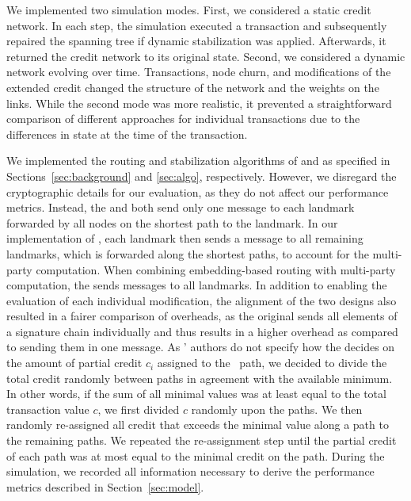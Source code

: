 We implemented two simulation modes. First, we considered a static credit network. In each step, the simulation executed a transaction and subsequently repaired the spanning tree if dynamic stabilization was applied. Afterwards, it returned the credit network to its original state. 
Second, we considered a dynamic network evolving over time. Transactions, node churn, and modifications of the extended credit changed
the structure of the network and the weights on the links. 
While the second mode was more realistic, it prevented a straightforward comparison of different approaches for individual transactions due to the differences in state at the time of the transaction.

We implemented the routing and stabilization algorithms of \cnsysname and \oursys as specified in Sections~\ref{sec:background} and \ref{sec:algo}, respectively. 
However, we disregard the cryptographic details
for our evaluation, as they do not affect our performance metrics. Instead, the \sender and \receiver both send only one message to each landmark forwarded by all nodes on the shortest path to the landmark. 
In our implementation of \cnsysname , each landmark then sends a message to all remaining landmarks, which is forwarded along the shortest paths, to account for the multi-party computation.
When combining embedding-based routing with multi-party computation, the \receiver sends messages to all landmarks.
In addition to enabling the evaluation of each individual modification, the alignment of the two designs also resulted in a fairer comparison of overheads, as the original \cnsysname sends all elements of a signature chain individually and thus results in a higher overhead as compared to sending them in one message.
As \cnsysname ' authors do not specify how the \sender decides on the amount of partial credit $c_i$ assigned to the \ith\ path, 
we decided to divide the total credit randomly between paths in agreement with the available minimum. In other words, if the sum of all minimal values was at least equal to the total transaction value $c$, we first divided $c$ randomly upon the paths.  We then randomly re-assigned all credit that exceeds the minimal value along a path to the remaining paths. We repeated the re-assignment step until the partial credit of each path was at most equal to the minimal credit on the path. 
During the simulation, we recorded all information necessary to derive the performance metrics described in Section~\ref{sec:model}.

